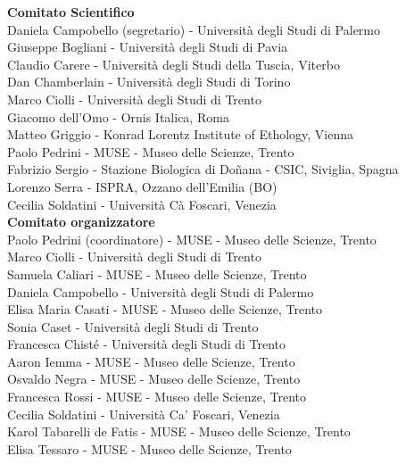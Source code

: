 \documentclass[10pt,twoside,openright,x11names,svgnames,italian,a4paper,dvipsnames,table]{memoir}
\begin{document}
{\vspace{.3cm}
\textbf{\color{MUSEBLUE}Comitato Scientifico} \\
Daniela Campobello (segretario) - Universit\`a degli Studi di Palermo \\
Giuseppe Bogliani - Universit\`a degli Studi di Pavia \\
Claudio Carere - Universit\`a degli Studi della Tuscia, Viterbo \\
Dan Chamberlain - Universit\`a degli Studi di Torino \\
Marco Ciolli - Universit\`a degli Studi di Trento \\
Giacomo dell'Omo - Ornis Italica, Roma \\
Matteo Griggio - Konrad Lorentz Institute of Ethology, Vienna \\
Paolo Pedrini - MUSE - Museo delle Scienze, Trento \\
Fabrizio Sergio - Stazione Biologica di Do\~nana - CSIC, Siviglia, Spagna \\
Lorenzo Serra - ISPRA, Ozzano dell{\textquoteright}Emilia (BO) \\
Cecilia Soldatini - Universit\`a C\`a Foscari, Venezia \\
\vspace{.3cm}
\textbf{\color{MUSEBLUE}Comitato organizzatore} \\
Paolo Pedrini (coordinatore) - MUSE - Museo delle Scienze, Trento \\
Marco Ciolli - Universit\`a degli Studi di Trento \\
Samuela Caliari - MUSE - Museo delle Scienze, Trento \\
Daniela Campobello - Universit\`a degli Studi di Palermo \\
Elisa Maria Casati - MUSE - Museo delle Scienze, Trento \\
Sonia Caset - Universit\`a degli Studi di Trento \\
Francesca Chist\'e - Universit\`a degli Studi di Trento \\
Aaron Iemma - MUSE - Museo delle Scienze, Trento \\
Osvaldo Negra - MUSE - Museo delle Scienze, Trento \\
Francesca Rossi - MUSE - Museo delle Scienze, Trento \\
Cecilia Soldatini - Universit\`a Ca' Foscari, Venezia \\
Karol Tabarelli de Fatis - MUSE - Museo delle Scienze, Trento \\
Elisa Tessaro - MUSE - Museo delle Scienze, Trento \\
}
\end{document}
